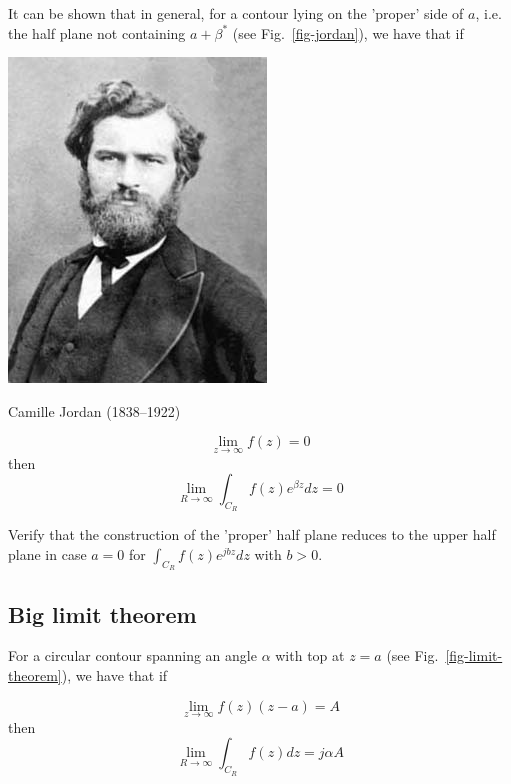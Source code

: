 It can be shown that in general, for a contour lying on the 'proper' side of $a$, i.e. the half plane not containing $a+\beta^*$ (see Fig.~\ref{fig-jordan}), we have that if

\begin{marginfigure}[-2.5cm]
  \includegraphics{complex/figures/camille_jordan}
  \caption{Camille Jordan (1838–1922) }
\end{marginfigure}

\begin{equation}
\lim_{z \to \infty} f(z) = 0
\end{equation}
then
\begin{equation}
\lim_{R \to \infty} \int_{{C}_R} f(z) e^{\beta z} dz = 0
\end{equation}

\begin{cue}
Verify that the construction of the 'proper' half plane reduces to the upper half plane in case $a=0$ for $ \int_{{C}_R} f(z) e^{jb z} dz$ with $b>0$.
\end{cue}

\subsection*{Big limit theorem}

For a circular contour spanning an angle $\alpha$ with top at $z=a$ (see Fig.~\ref{fig-limit-theorem}), we have that if

\begin{equation}
\lim_{z \to \infty}  f(z) (z-a) = A
\end{equation}
then
\begin{equation}
\lim_{R \to \infty} \int_{{C}_R} f(z) dz = j \alpha A
\end{equation}

